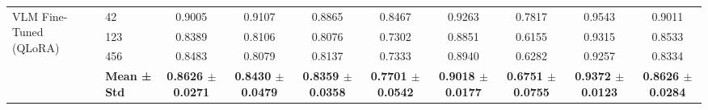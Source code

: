 \begin{table}[t]
\begin{tabular}{llcccccccc}
\hline
\multirow{4}{*}{VLM Fine-Tuned (QLoRA)} & 42 & 0.9005 & 0.9107 & 0.8865 & 0.8467 & 0.9263 & 0.7817 & 0.9543 & 0.9011 \\
 & 123 & 0.8389 & 0.8106 & 0.8076 & 0.7302 & 0.8851 & 0.6155 & 0.9315 & 0.8533 \\
 & 456 & 0.8483 & 0.8079 & 0.8137 & 0.7333 & 0.8940 & 0.6282 & 0.9257 & 0.8334 \\
 & \textbf{Mean ± Std} & \textbf{0.8626 $\pm$ 0.0271} & \textbf{0.8430 $\pm$ 0.0479} & \textbf{0.8359 $\pm$ 0.0358} & \textbf{0.7701 $\pm$ 0.0542} & \textbf{0.9018 $\pm$ 0.0177} & \textbf{0.6751 $\pm$ 0.0755} & \textbf{0.9372 $\pm$ 0.0123} & \textbf{0.8626 $\pm$ 0.0284} \\
\hline
\end{tabular}
\end{table}
